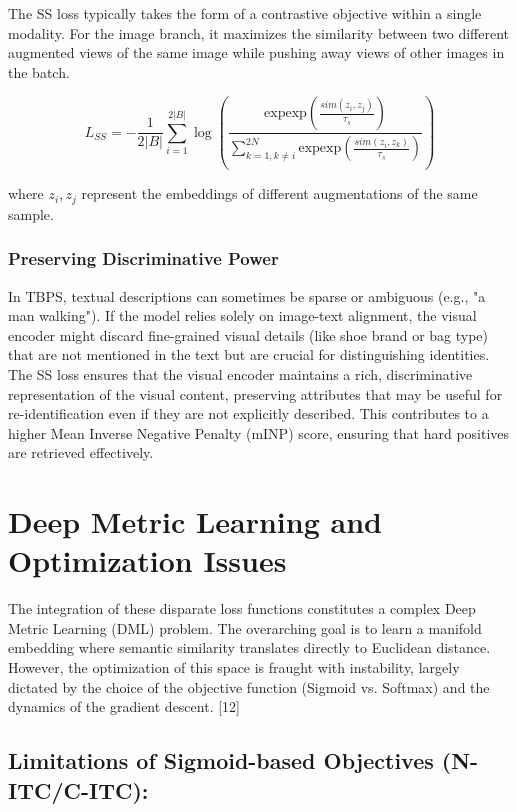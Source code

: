 \documentclass[../main.tex]{subfiles}
\begin{document}
\noindent The SS loss typically takes the form of a contrastive objective within a single modality. For the image branch, it maximizes the similarity between two different augmented views of the same image while pushing away views of other images in the batch.

\begin{equation}
    L_{SS} = - \frac{1}{2|B|} \sum_{i=1}^{2|B|} \log \left( \frac{\text{expexp} \left( \frac{sim(z_i, z_j)}{\tau_s} \right) }{\sum_{k=1, k \neq i}^{2N} \text{expexp} \left( \frac{sim(z_i, z_k)}{\tau_s} \right)} \right)
\end{equation}

where $z_i, z_j$ represent the embeddings of different augmentations of the same sample.

\subsubsection{Preserving Discriminative Power}

\noindent In TBPS, textual descriptions can sometimes be sparse or ambiguous (e.g., "a man walking"). If the model relies solely on image-text alignment, the visual encoder might discard fine-grained visual details (like shoe brand or bag type) that are not mentioned in the text but are crucial for distinguishing identities. The SS loss ensures that the visual encoder maintains a rich, discriminative representation of the visual content, preserving attributes that may be useful for re-identification even if they are not explicitly described. This contributes to a higher Mean Inverse Negative Penalty (mINP) score, ensuring that hard positives are retrieved effectively.

\section{Deep Metric Learning and Optimization Issues}

The integration of these disparate loss functions constitutes a complex Deep Metric Learning (DML) problem. The overarching goal is to learn a manifold embedding where semantic similarity translates directly to Euclidean distance. However, the optimization of this space is fraught with instability, largely dictated by the choice of the objective function (Sigmoid vs. Softmax) and the dynamics of the gradient descent. [12]

\subsection{Limitations of Sigmoid-based Objectives (N-ITC/C-ITC):}
\end{document}
